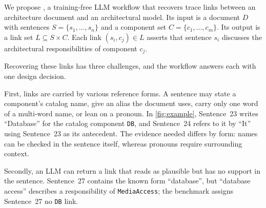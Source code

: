 \section{\approach}\label{sec:approach}
We propose \approach, a training-free \ac{LLM} workflow that recovers trace links between an architecture document and an architectural model.
Its input is a document $D$ with sentences $S = \{s_1, \ldots, s_n\}$ and a component set $C = \{c_1, \ldots, c_m\}$.
Its output is a link set $L \subseteq S \times C$.
Each link $(s_i, c_j) \in L$ asserts that sentence $s_i$ discusses the architectural responsibilities of component $c_j$.

Recovering these links has three challenges, and the workflow answers each with one design decision.

First, links are carried by various reference forms.
A sentence may state a component's catalog name, give an alias the document uses, carry only one word of a multi-word name, or lean on a pronoun.
In \autoref{fig:example}, Sentence~23 writes ``Database'' for the catalog component \texttt{DB}, and Sentence~24 refers to it by ``It'' using Sentence~23 as its antecedent.
The evidence needed differs by form: names can be checked in the sentence itself, whereas pronouns require surrounding context.

Secondly, an \ac{LLM} can return a link that reads as plausible but has no support in the sentence.
Sentence~27 contains the known form ``database'', but ``database access'' describes a responsibility of \texttt{MediaAccess}; the benchmark assigns Sentence~27 no \texttt{DB} link.

